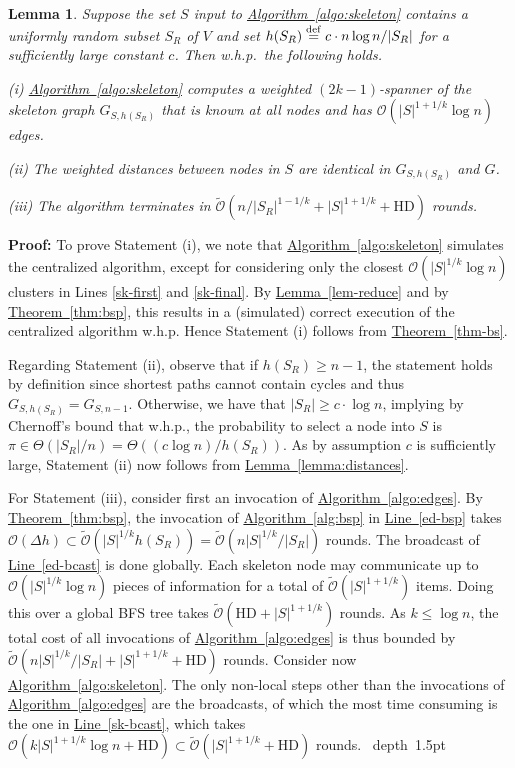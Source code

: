 \documentclass[letterpaper,11pt]{article}
\newcommand{\namedref}[2]{\hyperref[#2]{#1~\ref*{#2}}}
\newcommand{\theoremref}[1]{\namedref{Theorem}{#1}}
\newcommand{\lemmaref}[1]{\namedref{Lemma}{#1}}
\newcommand{\algref}[1]{\namedref{Algorithm}{#1}}
\newcommand{\lineref}[1]{\namedref{Line}{#1}}
\newtheorem{lemma}[theorem]{Lemma}
\newcommand{\blackslug}{\hbox{\hskip 1pt \vrule width 4pt height 8pt
depth 1.5pt \hskip 1pt}}
\newcommand{\QED}{\quad\blackslug\lower 8.5pt\null\par}
\newenvironment{proof}[1][Proof:]{\noindent \textbf{#1}\xspace}{\QED}
\newcommand{\BO}{\mathcal{O}}
\newcommand{\DEF}{\ensuremath{\stackrel{\rm def}{=}}}
\newcommand{\HD}{\mathrm{HD}}
\begin{document}
\begin{lemma}\label{lemma:spanner}
Suppose the set $S$ input to \algref{algo:skeleton} contains a uniformly random
subset $S_R$ of $V$ and set $h(S_R)\DEF c \cdot n \log n/|S_R|$ for a
sufficiently large constant $c$. Then w.h.p.\ the following holds.
\begin{compactitem}
\item[(i)] \algref{algo:skeleton} computes a weighted $(2k-1)$-spanner of
the skeleton graph $G_{S,h(S_R)}$ that is known at all nodes and has
$\BO(|S|^{1+1/k}\log n)$ edges.
\item[(ii)] The weighted distances between nodes in $S$ are identical in
$G_{S,h(S_R)}$ and $G$.
\item[(iii)] The algorithm terminates in
$\tilde{\BO}(n/|S_R|^{1-1/k}+|S|^{1+1/k}+\HD)$ rounds.
\end{compactitem}
\end{lemma}
\begin{proof}
To prove Statement (i), we note that \algref{algo:skeleton} simulates
the centralized algorithm, except for considering only the closest
$\BO(|S|^{1/k}\log n)$ clusters in Lines \ref{sk-first} and
\ref{sk-final}. By \lemmaref{lem-reduce} and by \theoremref{thm:bsp},
this results in a (simulated) correct execution of the centralized algorithm
w.h.p. Hence Statement (i) follows from \theoremref{thm-bs}.

Regarding Statement (ii), observe that if $h(S_R)\geq n-1$, the statement holds by
definition since shortest paths cannot contain cycles and thus
$G_{S,h(S_R)}=G_{S,n-1}$. Otherwise, we have that $|S_R|\geq c\cdot \log n$,
implying by Chernoff's bound that w.h.p., the probability to select a node into
$S$ is $\pi\in \Theta(|S_R|/n)=\Theta((c\log n)/h(S_R))$. As by assumption $c$
is sufficiently large, Statement (ii) now follows from
\lemmaref{lemma:distances}.

For Statement (iii), consider first an invocation of \algref{algo:edges}. By
\theoremref{thm:bsp}, the invocation of \algref{alg:bsp} in \lineref{ed-bsp}
takes $\BO(\Delta h)\subset
\tilde{\BO}(|S|^{1/k}h(S_R))=\tilde{\BO}(n|S|^{1/k}/|S_R|)$ rounds.
The broadcast of \lineref{ed-bcast} is done globally. Each skeleton node may
communicate up to $\BO(|S|^{1/k}\log n)$ pieces of information for a total of
$\tilde{\BO}(|S|^{1+1/k})$ items. Doing this over a global BFS tree
takes $\tilde{\BO}(\HD+|S|^{1+1/k})$ rounds. As $k\leq \log n$, the total cost
of all invocations of \algref{algo:edges} is thus bounded by
$\tilde{\BO}(n|S|^{1/k}/|S_R|+|S|^{1+1/k}+\HD)$ rounds. Consider now
\algref{algo:skeleton}. The only non-local steps other than the invocations of
\algref{algo:edges} are the broadcasts, of which the most time consuming is the
one in \lineref{sk-bcast}, which takes $\BO(k|S|^{1+1/k}\log n+\HD)\subset
\tilde{\BO}(|S|^{1+1/k}+\HD)$ rounds.
\end{proof}
\end{document}
